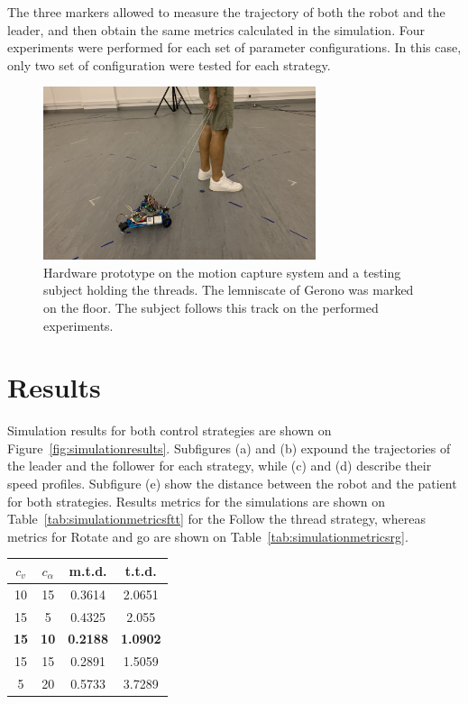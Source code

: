 \documentclass[journal]{IEEEtran}
\begin{document}
The three markers allowed to measure the trajectory of both the robot and the leader, and then obtain the same metrics calculated in the simulation.  Four experiments were performed for each set of parameter configurations.  In this case, only two set of configuration were tested for each strategy.

\begin{figure}[h!]
\centering
\includegraphics[width=8cm]{images/capture.png}
\caption{Hardware prototype on the motion capture system and a testing subject holding the threads.  The lemniscate of Gerono was marked on the floor.  The subject follows this track on the performed experiments.}
\label{fig:capturesystem}
\end{figure}



\section{Results} \label{Results}
\label{results}

Simulation results for both control strategies are shown on Figure~\ref{fig:simulationresults}. Subfigures (a) and (b) expound the trajectories of the leader and the follower for each strategy, while (c) and (d) describe their speed profiles.  Subfigure (e) show the distance between the robot and the patient for both strategies.  Results metrics for the simulations are shown on Table~\ref{tab:simulationmetricsftt} for the Follow the thread strategy, whereas metrics for Rotate and go are shown on Table~\ref{tab:simulationmetricsrg}.


\begin{center}
\begin{tabular}{ |c|c|c|c| }
\hline
$c_v$ & $c_{\alpha}$ & m.t.d. & t.t.d. \\
\hline
10  &   15  & 0.3614 & 2.0651\\
15  &   5  & 0.4325 & 2.055\\
\textbf{15}  &   \textbf{10}  & \textbf{0.2188} & \textbf{1.0902}\\
15  &   15  & 0.2891 & 1.5059\\
5  &   20  & 0.5733 & 3.7289\\
\hline
\end{tabular}
\label{tab:simulationmetricsftt}
\end{center}
\end{document}
